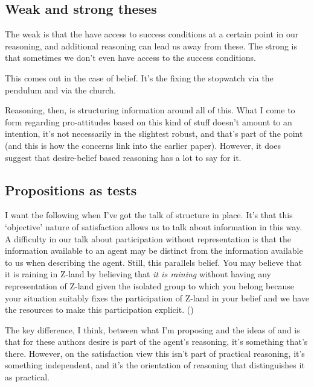 \documentclass[10pt]{article}
\begin{document}
\subsection{Weak and strong theses}
\label{sec:weak-strong-theses}


The weak is that the have access to success conditions at a certain point in our reasoning, and additional reasoning can lead us away from these.
The strong is that sometimes we don't even have access to the success conditions.

This comes out in the case of belief.
It's the fixing the stopwatch via the pendulum and via the church.

Reasoning, then, is structuring information around all of this.
What I come to form regarding pro-attitudes based on this kind of stuff doesn't amount to an intention, it's not necessarily in the slightest robust, and that's part of the point (and this is how the concerns link into the earlier paper).
However, it does suggest that desire-belief based reasoning has a lot to say for it.


\subsection{Propositions as tests}
\label{sec:prop-as-tests}

\newpage



{\color{red}
  I want the following when I've got the talk of structure in place.
  It's that this `objective' nature of satisfaction allows us to talk about information in this way.
}
A difficulty in our talk about participation without representation is that the information available to an agent may be distinct from the information available to us when describing the agent.
Still, this parallels belief.
You may believe that it is raining in Z-land by believing that \emph{it is raining} without having any representation of Z-land given the isolated group to which you belong because your situation suitably fixes the participation of Z-land in your belief and we have the resources to make this participation explicit.
(\cite[cf.][]{Perry:1986aa})


{\color{red}
  The key difference, I think, between what I'm proposing and the ideas of \citeauthor{Pettit:1990aa} and \citeauthor{Schroeder:2007aa} is that for these authors desire is part of the agent's reasoning, it's something that's there.
  However, on the satisfaction view this isn't part of practical reasoning, it's something independent, and it's the orientation of reasoning that distinguishes it as practical.
}
\end{document}
